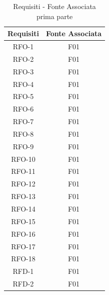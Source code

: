 \begin{table}[h]
\begin{center}
     \begin{tabular}
           {@{\extracolsep{\fill}}|c|c|}
     \hline
      \textbf{Requisiti} & \textbf{Fonte Associata} \\
      \hline
     RFO-1 & F01 \\
     \hline
     RFO-2 & F01  \\
     \hline
     RFO-3 & F01\\
     \hline
     RFO-4 & F01 \\
     \hline
     RFO-5 & F01 \\
     \hline
     RFO-6 & F01 \\
      \hline
     RFO-7 & F01 \\
     \hline
     RFO-8 & F01 \\
     \hline
     RFO-9 &  F01 \\
     \hline
     RFO-10 & F01 \\
     \hline
     RFO-11 & F01 \\
     \hline
     RFO-12 & F01 \\
     \hline
     RFO-13 & F01 \\
     \hline
     RFO-14 & F01 \\
     \hline
     RFO-15 & F01 \\
     \hline
     RFO-16 & F01 \\
     \hline 
     RFO-17 & F01 \\
     \hline
     RFO-18 & F01 \\
     \hline
     RFD-1 & F01 \\
     \hline
     RFD-2 & F01 \\
    \hline %
    \end{tabular}
  \caption{Requisiti - Fonte Associata prima parte} %
  \label{tab:reqfonte1}
  \end{center}
\end{table}
     
     
     
\newpage

